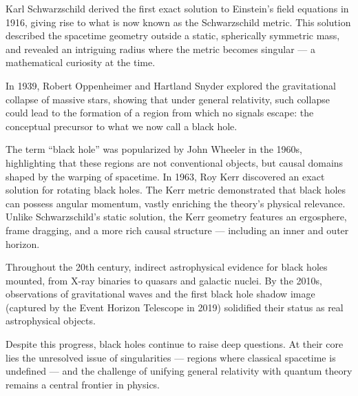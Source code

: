 \begin{historical}
Karl Schwarzschild derived the first exact solution to Einstein's field equations in 1916, giving rise to what is now known as the Schwarzschild metric. This solution described the spacetime geometry outside a static, spherically symmetric mass, and revealed an intriguing radius where the metric becomes singular — a mathematical curiosity at the time.

In 1939, Robert Oppenheimer and Hartland Snyder explored the gravitational collapse of massive stars, showing that under general relativity, such collapse could lead to the formation of a region from which no signals escape: the conceptual precursor to what we now call a black hole.

The term “black hole” was popularized by John Wheeler in the 1960s, highlighting that these regions are not conventional objects, but causal domains shaped by the warping of spacetime. In 1963, Roy Kerr discovered an exact solution for rotating black holes. The Kerr metric demonstrated that black holes can possess angular momentum, vastly enriching the theory’s physical relevance. Unlike Schwarzschild’s static solution, the Kerr geometry features an ergosphere, frame dragging, and a more rich causal structure — including an inner and outer horizon.

Throughout the 20th century, indirect astrophysical evidence for black holes mounted, from X-ray binaries to quasars and galactic nuclei. By the 2010s, observations of gravitational waves and the first black hole shadow image (captured by the Event Horizon Telescope in 2019) solidified their status as real astrophysical objects.

Despite this progress, black holes continue to raise deep questions. At their core lies the unresolved issue of singularities — regions where classical spacetime is undefined — and the challenge of unifying general relativity with quantum theory remains a central frontier in physics.
\end{historical}